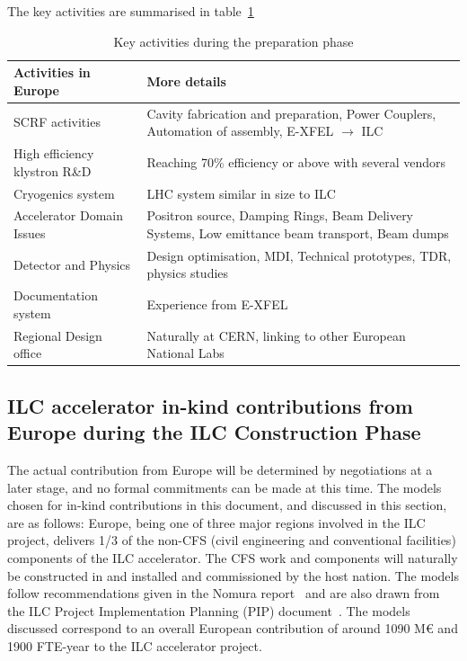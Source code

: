 \documentclass[%
 reprint,
 floatfix,
 amsmath,amssymb,
 aps,
]{revtex4-1}
\begin{document}
The key activities are summarised in table~\ref{fig:prep-phase-summary} 




\begin{table}[htbp]

\begin{tabular}{p{3.5cm}p{4.75cm}}
 \bfseries {Activities in Europe} &\bfseries{More details}                                                         \\[4pt]\hline\noalign{\smallskip}
SCRF activities			&Cavity fabrication and preparation, Power Couplers, Automation of assembly, E-XFEL $\rightarrow$ ILC\\[4pt]
High efficiency klystron R\&D   &Reaching 70\% efficiency or above with several vendors   \\[4pt]
Cryogenics system               &LHC system similar in size to ILC\\[4pt]
Accelerator Domain Issues       &Positron source, Damping Rings, Beam Delivery Systems, Low emittance beam transport, Beam dumps\\[4pt]
Detector and Physics            &Design optimisation, MDI, Technical prototypes, TDR, physics studies\\[4pt]
Documentation system            &Experience from E-XFEL                                       \\[4pt]
Regional Design office          &Naturally at CERN, linking to other European National Labs \\[5pt] \hline
\end{tabular}

\caption{\label{fig:prep-phase-summary} Key activities during the preparation phase}
\end{table}


\subsection{ILC accelerator in-kind contributions from Europe during the ILC Construction Phase ~\label{sec:acc:constrphase}}

The actual contribution from Europe will be determined by negotiations at a 
later stage, and no formal commitments can be made at this time. The models 
chosen for in-kind contributions in this document, and discussed in this 
section, are as follows: Europe, being one of three major regions involved in 
the ILC project, delivers 1/3 of the non-CFS (civil engineering and conventional facilities) 
components of the ILC accelerator. The CFS work 
and components will naturally be constructed in and installed and 
commissioned by the host nation. The models follow recommendations given in 
the Nomura report~\cite{Nomura-eng} and are also drawn from the ILC Project Implementation 
Planning (PIP) document~\cite{ILCPIP}. The models discussed correspond to an overall 
European contribution of around 1090 M\euro{} and 1900 FTE-year to the ILC accelerator project. 
\end{document}
